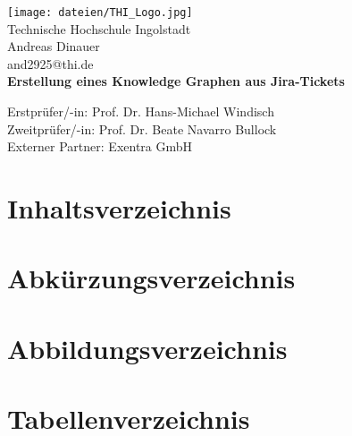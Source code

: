 \documentclass[10pt]{article}
\begin{document}
\renewcommand\thesection{\Roman{section}}
\begin{titlepage}
    \begin{center}
        \texttt{[image: dateien/THI\_Logo.jpg]} \\
        \vspace{0.5cm}
        Technische Hochschule Ingolstadt\\
        \vspace{1cm}
        \normalsize
        Andreas Dinauer\\
        and2925@thi.de\\
        
        \vspace*{0.5cm}
        \LARGE
        \textbf{Erstellung eines Knowledge Graphen aus Jira-Tickets}
            
        \vspace{1cm}
        \normalsize
        Erstprüfer/-in: Prof. Dr. Hans-Michael Windisch \\
        Zweitprüfer/-in: Prof. Dr. Beate Navarro Bullock \\
        \vspace{1cm}
        \normalsize
        Externer Partner: Exentra GmbH
            
    \end{center}
\end{titlepage}

\newpage

\section{Inhaltsverzeichnis}
\newpage
\section{Abkürzungsverzeichnis}
\newpage
\section{Abbildungsverzeichnis}
\newpage
\section{Tabellenverzeichnis}
\newpage
\setcounter{section}{0}
\renewcommand\thesection{\arabic{section}}

\end{document}
